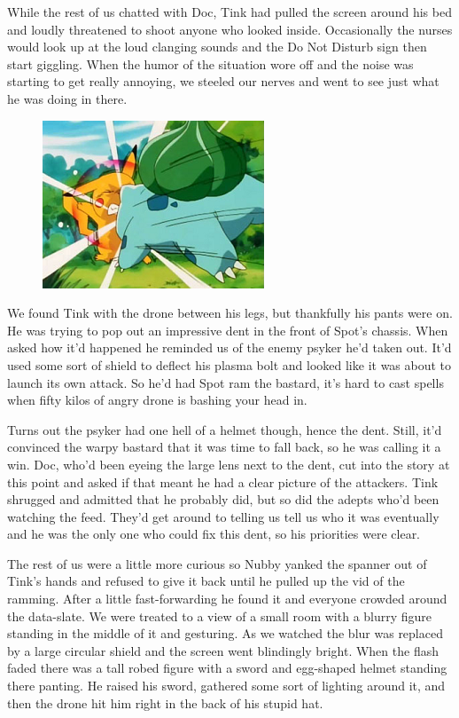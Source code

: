 While the rest of us chatted with Doc, Tink had pulled the screen around his bed and loudly threatened to shoot anyone who looked inside. 
Occasionally the nurses would look up at the loud clanging sounds and the Do Not Disturb sign then start giggling. 
When the humor of the situation wore off and the noise was starting to get really annoying, we steeled our nerves and went to see just what he was doing in there. 


\begin{figure}
	\begin{center}
		\includegraphics[width=\figwidth]{pics/11/31.png}
	\end{center}
\end{figure}
We found Tink with the drone between his legs, but thankfully his pants were on. 
He was trying to pop out an impressive dent in the front of Spot's chassis. 
When asked how it'd happened he reminded us of the enemy psyker he'd taken out. 
It'd used some sort of shield to deflect his plasma bolt and looked like it was about to launch its own attack. 
So he'd had Spot ram the bastard, it's hard to cast spells when fifty kilos of angry drone is bashing your head in.

Turns out the psyker had one hell of a helmet though, hence the dent. 
Still, it'd convinced the warpy bastard that it was time to fall back, so he was calling it a win. 
Doc, who'd been eyeing the large lens next to the dent, cut into the story at this point and asked if that meant he had a clear picture of the attackers. 
Tink shrugged and admitted that he probably did, but so did the adepts who'd been watching the feed. 
They'd get around to telling us tell us who it was eventually and he was the only one who could fix this dent, so his priorities were clear. 


The rest of us were a little more curious so Nubby yanked the spanner out of Tink's hands and refused to give it back until he pulled up the vid of the ramming. 
After a little fast-forwarding he found it and everyone crowded around the data-slate. 
We were treated to a view of a small room with a blurry figure standing in the middle of it and gesturing. 
As we watched the blur was replaced by a large circular shield and the screen went blindingly bright. 
When the flash faded there was a tall robed figure with a sword and egg-shaped helmet standing there panting. 
He raised his sword, gathered some sort of lighting around it, and then the drone hit him right in the back of his stupid hat.

